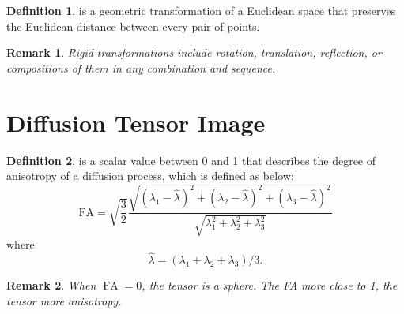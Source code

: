 \documentclass[a4paper]{article}
\theoremstyle{definition}
\newtheorem{definition}{Definition}
\theoremstyle{plain}
\newtheorem{remark}{Remark}
\begin{document}
\begin{definition}
 is a geometric transformation of a Euclidean space that preserves the Euclidean distance between every pair of points.
\end{definition}

\begin{remark}
Rigid transformations include rotation, translation, reflection, or compositions of them in any combination and sequence.
\end{remark}
\newpage
\section{Diffusion Tensor Image}
\begin{definition}
 is a scalar value between 0 and 1 that describes the degree of anisotropy of a diffusion process, which is defined as below:
\begin{equation*}
    {\text{FA}}={\sqrt  {{\frac  {3}{2}}}}{\frac  {{\sqrt  {(\lambda _{1}-{\hat  {\lambda }})^{2}+(\lambda _{2}-{\hat  {\lambda }})^{2}+(\lambda _{3}-{\hat  {\lambda }})^{2}}}}{{\sqrt  {\lambda _{1}^{2}+\lambda _{2}^{2}+\lambda _{3}^{2}}}}}
\end{equation*}
where
\begin{equation*}
     {\hat {\lambda }}=(\lambda _{1}+\lambda _{2}+\lambda _{3})/3.
\end{equation*}
\end{definition}

\begin{remark}
When $\operatorname{FA}=0$, the tensor is a sphere. The FA more close to 1, the tensor more anisotropy.
\end{remark}
\end{document}
